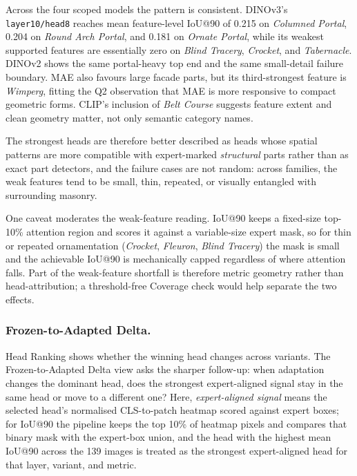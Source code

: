\documentclass[lineno,pdflatex,sn-mathphys-num]{sn-jnl}%
\theoremstyle{thmstyleone}%
\theoremstyle{thmstyletwo}%
\theoremstyle{thmstylethree}%
\begin{document}
Across the four scoped models the pattern is consistent. DINOv3's
\texttt{layer10/head8} reaches mean feature-level IoU@90 of 0.215 on
\emph{Columned Portal}, 0.204 on \emph{Round Arch Portal}, and 0.181 on
\emph{Ornate Portal}, while its weakest supported features are essentially
zero on \emph{Blind Tracery}, \emph{Crocket}, and \emph{Tabernacle}. DINOv2
shows the same portal-heavy top end and the same small-detail failure
boundary. MAE also favours large facade parts, but its third-strongest feature
is \emph{Wimperg}, fitting the Q2 observation that MAE is more responsive to
compact geometric forms. CLIP's inclusion of \emph{Belt Course} suggests
feature extent and clean geometry matter, not only semantic category names.

The strongest heads are therefore better described as heads whose spatial
patterns are more compatible with expert-marked \emph{structural} parts rather
than as exact part detectors, and the failure cases are not random: across
families, the weak features tend to be small, thin, repeated, or visually
entangled with surrounding masonry.

One caveat moderates the weak-feature reading. IoU@90 keeps a fixed-size
top-10\% attention region and scores it against a variable-size expert mask,
so for thin or repeated ornamentation (\emph{Crocket}, \emph{Fleuron},
\emph{Blind Tracery}) the mask is small and the achievable IoU@90 is
mechanically capped regardless of where attention falls. Part of the
weak-feature shortfall is therefore metric geometry rather than
head-attribution; a threshold-free Coverage check would help separate the two
effects.

\subsubsection*{Frozen-to-Adapted Delta.}
Head Ranking shows whether the winning head changes across variants. The
Frozen-to-Adapted Delta view asks the sharper follow-up: when adaptation
changes the dominant head, does the strongest expert-aligned signal stay in
the same head or move to a different one? Here, \emph{expert-aligned signal}
means the selected head's normalised CLS-to-patch heatmap scored against
expert boxes; for IoU@90 the pipeline keeps the top 10\% of heatmap pixels
and compares that binary mask with the expert-box union, and the head with the
highest mean IoU@90 across the 139 images is treated as the strongest
expert-aligned head for that layer, variant, and metric.
\end{document}
